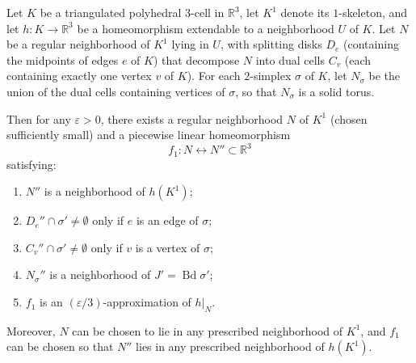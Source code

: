 Let $K$ be a triangulated polyhedral $3$-cell in $\mathbb{R}^3$, let $K^1$ denote its $1$-skeleton, and let $h: K \to \mathbb{R}^3$ be a homeomorphism extendable to a neighborhood $U$ of $K$. Let $N$ be a regular neighborhood of $K^1$ lying in $U$, with splitting disks $D_e$ (containing the midpoints of edges $e$ of $K$) that decompose $N$ into dual cells $C_v$ (each containing exactly one vertex $v$ of $K$). For each $2$-simplex $\sigma$ of $K$, let $N_{\sigma}$ be the union of the dual cells containing vertices of $\sigma$, so that $N_{\sigma}$ is a solid torus.

Then for any $\varepsilon > 0$, there exists a regular neighborhood $N$ of $K^1$ (chosen sufficiently small) and a piecewise linear homeomorphism
$$f_1 : N \leftrightarrow N'' \subset \mathbb{R}^3$$
satisfying:
\begin{enumerate}
\item $N''$ is a neighborhood of $h(K^1)$;
\item $D_e'' \cap \sigma' \neq \emptyset$ only if $e$ is an edge of $\sigma$;
\item $C_v'' \cap \sigma' \neq \emptyset$ only if $v$ is a vertex of $\sigma$;
\item $N_{\sigma}''$ is a neighborhood of $J' = \operatorname{Bd} \sigma'$;
\item $f_1$ is an $(\varepsilon/3)$-approximation of $h|_N$.
\end{enumerate}
Moreover, $N$ can be chosen to lie in any prescribed neighborhood of $K^1$, and $f_1$ can be chosen so that $N''$ lies in any prescribed neighborhood of $h(K^1)$.
